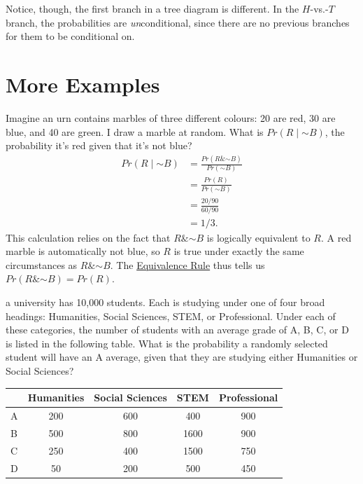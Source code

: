 \documentclass[justified]{tufte-book}
\newcommand{\given}{\mid}
\renewcommand{\neg}{\mathbin{\sim}}
\renewcommand{\wedge}{\mathbin{\&}}
\newcommand{\p}{Pr}
\theoremstyle{definition}
\theoremstyle{definition}
\theoremstyle{definition}
\theoremstyle{definition}
\theoremstyle{remark}
\begin{document}
Notice, though, the first branch in a tree diagram is different. In the \(H\)-vs.-\(T\) branch, the probabilities are \emph{un}conditional, since there are no previous branches for them to be conditional on.

\hypertarget{more-examples}{%
\section{More Examples}\label{more-examples}}

Imagine an urn contains marbles of three different colours: 20 are red, 30 are blue, and 40 are green. I draw a marble at random. What is \(\p(R \given \neg B)\), the probability it's red given that it's not blue?
\[
  \begin{aligned}
    \p(R \given \neg B) &= \frac{\p(R \wedge \neg B)}{\p(\neg B)}\\
                        &= \frac{\p(R)}{\p(\neg B)}\\
                        &= \frac{20/90}{60/90}\\
                        &= 1/3.
  \end{aligned}
\]
This calculation relies on the fact that \(R \wedge \neg B\) is logically equivalent to \(R\). A red marble is automatically not blue, so \(R\) is true under exactly the same circumstances as \(R \wedge \neg B\). The \protect\hyperlink{tautologies-contradictions-and-equivalent-propositions}{Equivalence Rule} thus tells us \(\p(R \wedge \neg B) = \p(R)\).

 a university has 10,000 students. Each is studying under one of four broad headings: Humanities, Social Sciences, STEM, or Professional. Under each of these categories, the number of students with an average grade of A, B, C, or D is listed in the following table. What is the probability a randomly selected student will have an A average, given that they are studying either Humanities or Social Sciences?

\begin{longtable}[]{@{}lcccc@{}}
\toprule
& Humanities & Social Sciences & STEM & Professional \\
\midrule
\endhead
A & 200 & 600 & 400 & 900 \\
B & 500 & 800 & 1600 & 900 \\
C & 250 & 400 & 1500 & 750 \\
D & 50 & 200 & 500 & 450 \\
\bottomrule
\end{longtable}
\end{document}
